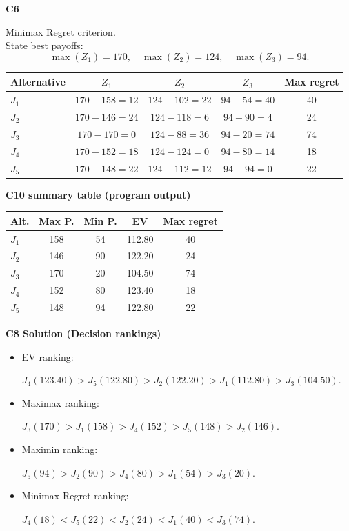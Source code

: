 \begin{ExamProblems}
		\textbf{C6}\par
		Minimax Regret criterion.\\
				State best payoffs:
		\[
		\max(Z_1)=170,\quad \max(Z_2)=124,\quad \max(Z_3)=94.
		\]
		\begin{center}
			\begin{tabular}{l c c c c}
				\toprule
				Alternative & $Z_1$ & $Z_2$ & $Z_3$ & Max regret \\
				\midrule
				$J_1$ & $170-158=12$ & $124-102=22$ & $94-54=40$ & 40 \\
				$J_2$ & $170-146=24$ & $124-118=6$ & $94-90=4$ & 24 \\
				$J_3$ & $170-170=0$ & $124-88=36$ & $94-20=74$ & 74 \\
				$J_4$ & $170-152=18$ & $124-124=0$ & $94-80=14$ & 18 \\
				$J_5$ & $170-148=22$ & $124-112=12$ & $94-94=0$ & 22 \\
				\bottomrule
			\end{tabular}
		\end{center}
		

		\textbf{C10 summary table (program output)}\par
		\begin{center}
			\begin{tabular}{l c c c c}
				\hline
				Alt. & Max P. & Min P. & EV & Max regret \\
				\hline
				$J_1$ & 158 & 54 & 112.80 & 40 \\
				$J_2$ & 146 & 90 & 122.20 & 24 \\
				$J_3$ & 170 & 20 & 104.50 & 74 \\
				$J_4$ & 152 & 80 & 123.40 & 18 \\
				$J_5$ & 148 & 94 & 122.80 & 22 \\
				\hline
			\end{tabular}
		\end{center}
		
		\textbf{C8 Solution (Decision rankings)}\par
		\begin{itemize}
			\item EV ranking: \par $J_4(123.40)>J_5(122.80)>J_2(122.20)>J_1(112.80)>J_3(104.50)$.
			\item Maximax ranking:\par $J_3(170)>J_1(158)>J_4(152)>J_5(148)>J_2(146)$.
			\item Maximin ranking: \par $J_5(94)>J_2(90)>J_4(80)>J_1(54)>J_3(20)$.
			\item Minimax Regret ranking:\par $J_4(18)<J_5(22)<J_2(24)<J_1(40)<J_3(74)$.
		\end{itemize}
		

\end{ExamProblems}
